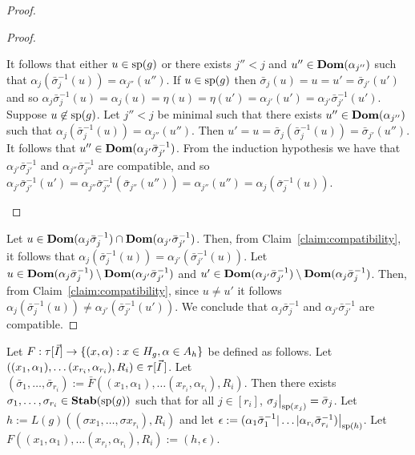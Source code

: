 \documentclass[../main/thesis.tex]{subfiles}
\begin{document}
\begin{proof}
\begin{proof}
\begin{myenum}
      It follows that either $u \in \text{sp}(g)$ or there exists $j'' < j$ and
      $u'' \in \text{\textbf{Dom}}(\alpha_{j''})$ such that $\alpha_j(\bar{\sigma}^{-1}_j(u)) =
      \alpha_{j''}(u'')$. If $u \in \text{sp}(g)$ then $\bar{\sigma}_{j}(u) = u =
      u' = \bar{\sigma}_{j'}(u')$ and so $\alpha_j \bar{\sigma}^{-1}_j(u) =
      \alpha_j (u) = \eta (u) = \eta (u') = \alpha_{j'}(u') =
      \alpha_{j'}\bar{\sigma}^{-1}_{j'}(u')$. Suppose $u \not\in \text{sp}(g)$. Let
      $j'' < j$ be minimal such that there exists $u'' \in \text{\textbf{Dom}}(\alpha_{j''})$
      such that $\alpha_{j} (\bar{\sigma}^{-1}_{j}(u)) = \alpha_{j''} (u'')$.
      Then $u' = u = \bar{\sigma}_j (\bar{\sigma}^{-1}_{j}(u)) =
      \bar{\sigma}_{j'}(u'')$. It follows that $u'' \in
      \text{\textbf{Dom}}(\alpha_{j'}\bar{\sigma}^{-1}_{j'})$. From the induction hypothesis we
      have that $\alpha_{j'}\bar{\sigma}^{-1}_{j'}$ and
      $\alpha_{j''}\bar{\sigma}^{-1}_{j''}$ are compatible, and so
      $\alpha_{j'}\bar{\sigma}^{-1}_{j'}(u') =
      \alpha_{j''}\bar{\sigma}^{-1}_{j''}(\bar{\sigma}_{j''}(u'')) =
      \alpha_{j''}(u'') = \alpha_{j} (\bar{\sigma}^{-1}_{j}(u))$.
    \end{myenum}
  \end{proof}

  Let $u \in \text{\textbf{Dom}}(\alpha_{j}\bar{\sigma}^{-1}_j) \cap
  \text{\textbf{Dom}}(\alpha_{j'}\bar{\sigma}^{-1}_{j'})$. Then, from
  Claim~\ref{claim:compatibility}, it follows that $\alpha_j
  (\bar{\sigma}^{-1}_j(u)) = \alpha_{j'}(\bar{\sigma}^{-1}_{j'}(u))$. Let $u \in
  \text{\textbf{Dom}}(\alpha_{j}\bar{\sigma}^{-1}_j) \setminus
  \text{\textbf{Dom}}(\alpha_{j'}\bar{\sigma}^{-1}_{j'})$ and $u' \in
  \text{\textbf{Dom}}(\alpha_{j'}\bar{\sigma}^{-1}_{j'}) \setminus
  \text{\textbf{Dom}}(\alpha_{j}\bar{\sigma}^{-1}_j)$. Then, from
  Claim~\ref{claim:compatibility}, since $u \neq u'$ it follows $\alpha_j
  (\bar{\sigma}^{-1}_j(u)) \neq \alpha_{j'}(\bar{\sigma}^{-1}_{j'}(u'))$. We
  conclude that $\alpha_{j}\bar{\sigma}^{-1}_{j}$ and
  $\alpha_{j'}\bar{\sigma}^{-1}_{j'}$ are compatible.
\end{proof}

Let $F : \tau[\vec{I}] \rightarrow \{ (x, \alpha) : x \in H_g, \alpha \in
A_h\}$ be defined as follows. Let $((x_1, \alpha_1), \ldots (x_{r_i},
\alpha_{r_i}), R_i) \in \tau[\vec{I} \,]$. Let $(\bar{\sigma}_1,
\ldots, \bar{\sigma}_{r_i}) := \bar{F}((x_1, \alpha_1), \ldots (x_{r_i},
\alpha_{r_i}), R_i)$. Then there exists $\sigma_1, \ldots, \sigma_{r_i} \in
\text{\textbf{Stab}} (\text{sp} (g))$ such that for all $j \in [r_i]$, $\restr{\sigma_j}{\consp(x_j)} =
\bar{\sigma}_j$. Let $h := L(g)((\sigma x_1, \ldots, \sigma x_{r_i}), R_i)$ and
let $\epsilon := \restr{(\alpha_1 \bar{\sigma}^{-1}_1 \vert \ldots \vert
  \alpha_{r_i} \bar{\sigma}^{-1}_{r_i})}{\consp(h)}$. Let $F ((x_1, \alpha_1),
\ldots (x_{r_i}, \alpha_{r_i}), R_i) := (h, \epsilon)$.
\end{document}
